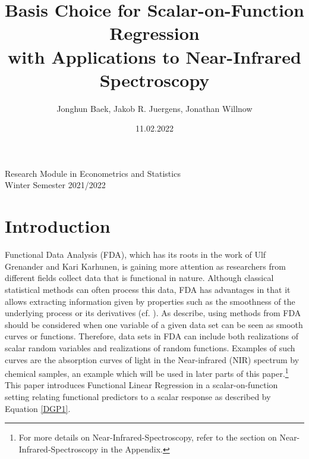 \documentclass[11pt,twoside,a4paper]{article}
\begin{document}
	\title{{\LARGE Basis Choice for Scalar-on-Function Regression \\ with Applications to Near-Infrared Spectroscopy}}
	\author{Jonghun Baek, Jakob R. Juergens, Jonathan Willnow}
	\date{11.02.2022}
	\maketitle
	\vspace{1.5 cm}
	\begin{center}
		Research Module in Econometrics and Statistics \\
		Winter Semester 2021/2022
	\end{center}
	
	\newpage
	
	\tableofcontents
	
	\newpage
	

	\section{Introduction}
		
	Functional Data Analysis (FDA), which has its roots in the work of Ulf Grenander and Kari Karhunen, is gaining more attention as researchers from different fields collect data that is functional in nature. Although classical statistical methods can often process this data, FDA has advantages in that it allows extracting information given by properties such as the smoothness of the underlying process or its derivatives (cf. \cite{levitin_introduction_2007}).	As \cite{kokoszka_introduction_2017} describe, using methods from FDA should be considered when one variable of a given data set can be seen as smooth curves or functions.	 
	Therefore, data sets in FDA can include both realizations of scalar random variables and realizations of random functions. Examples of such curves are the absorption curves of light in the Near-infrared (NIR) spectrum by chemical samples, an example which will be used in later parts of this paper.\footnote{For more details on Near-Infrared-Spectroscopy, refer to the section on Near-Infrared-Spectroscopy in the Appendix.}  
	This paper introduces Functional Linear Regression in a scalar-on-function setting relating functional predictors to a scalar response as described by Equation \ref{DGP1}.
	 
\end{document}
